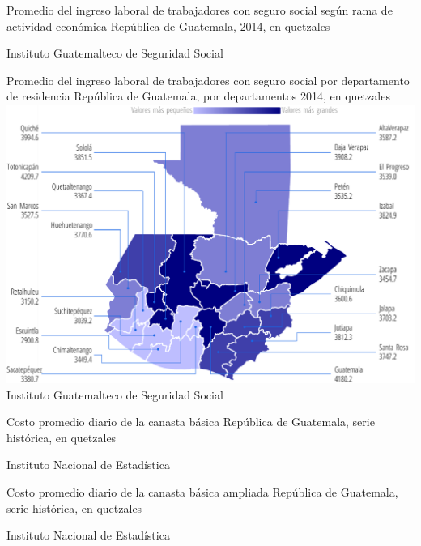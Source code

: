 
%
{%
}%
{%
	Promedio del ingreso laboral de trabajadores con seguro social según rama de actividad económica} %
{%
	República de Guatemala, 2014, en quetzales } %
{%
	\begin{tikzpicture}[x=1pt,y=1pt]    \end{tikzpicture}}%
{%
	Instituto Guatemalteco de Seguridad Social} %

  
  {%
  }%
  {%
  	Promedio del ingreso laboral de trabajadores con seguro social por departamento de residencia
  } %
  {%
  	República de Guatemala, por departamentos 2014, en quetzales} %
  {%
  	\includegraphics[width=52\cuadri]{graficas/3_06.pdf}}%
  {%
  	Instituto Guatemalteco de Seguridad Social} %


%
{%
}%
{%
Costo promedio diario de la canasta básica } %
{%
	República de Guatemala, serie histórica, en quetzales } %
{%
	\begin{tikzpicture}[x=1pt,y=1pt]    \end{tikzpicture}}%
{%
	Instituto Nacional de Estadística} %


%
{%
}%
{%
	Costo promedio diario de la canasta básica ampliada } %
{%
	República de Guatemala, serie histórica, en quetzales } %
{%
	\begin{tikzpicture}[x=1pt,y=1pt]    \end{tikzpicture}}%
{%
	Instituto Nacional de Estadística} %
